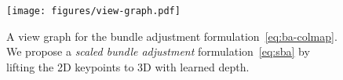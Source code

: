 
\begin{figure}
    \centering
    \texttt{[image: figures/view-graph.pdf]}
    \caption{A view graph for the bundle adjustment formulation~\eqref{eq:ba-colmap}. We propose a \emph{scaled bundle adjustment} formulation~\eqref{eq:sba} by lifting the 2D keypoints to 3D with learned depth.}
    \label{fig:3d-view-graph}
    \vspace{-4mm}
\end{figure}